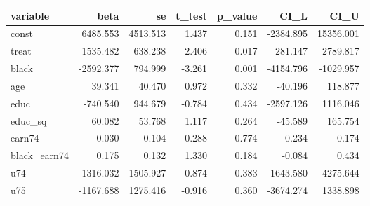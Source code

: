\begin{tabular}{lrrrrrr}
  \hline
variable & beta & se & t\_test & p\_value & CI\_L & CI\_U \\ 
  \hline
const & 6485.553 & 4513.513 & 1.437 & 0.151 & -2384.895 & 15356.001 \\ 
  treat & 1535.482 & 638.238 & 2.406 & 0.017 & 281.147 & 2789.817 \\ 
  black & -2592.377 & 794.999 & -3.261 & 0.001 & -4154.796 & -1029.957 \\ 
  age & 39.341 & 40.470 & 0.972 & 0.332 & -40.196 & 118.877 \\ 
  educ & -740.540 & 944.679 & -0.784 & 0.434 & -2597.126 & 1116.046 \\ 
  educ\_sq & 60.082 & 53.768 & 1.117 & 0.264 & -45.589 & 165.754 \\ 
  earn74 & -0.030 & 0.104 & -0.288 & 0.774 & -0.234 & 0.174 \\ 
  black\_earn74 & 0.175 & 0.132 & 1.330 & 0.184 & -0.084 & 0.434 \\ 
  u74 & 1316.032 & 1505.927 & 0.874 & 0.383 & -1643.580 & 4275.644 \\ 
  u75 & -1167.688 & 1275.416 & -0.916 & 0.360 & -3674.274 & 1338.898 \\ 
   \hline
\end{tabular}
